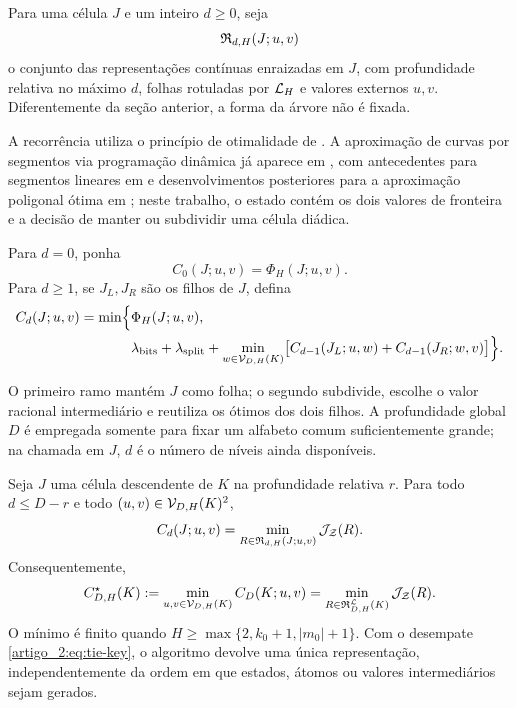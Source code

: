 Para uma célula $J$ e um inteiro $d\ge0$, seja
\[
 \mathfrak{R}_{d,H}(J;u,v)
\]
o conjunto das representações contínuas enraizadas em $J$, com profundidade
relativa no máximo $d$, folhas rotuladas por $\mathcal{L}_H$ e valores externos
$u,v$. Diferentemente da seção anterior, a forma da árvore não é fixada.

A recorrência utiliza o princípio de otimalidade de \citet{artigo_2-bellman1957}. A
aproximação de curvas por segmentos via programação dinâmica já aparece em
\citet{artigo_2-bellman1961}, com antecedentes para segmentos lineares em
\citet{artigo_2-stone1961} e desenvolvimentos posteriores para a aproximação poligonal
ótima em \citet{artigo_2-perezvidal1994}; neste trabalho, o estado contém os dois valores de
fronteira e a decisão de manter ou subdividir uma célula diádica.

\begin{definition}\label{map:artigo_2:7.1}
\label{artigo_2:def:variable-recurrence}
Para $d=0$, ponha
\begin{equation}
 C_0(J;u,v)=\Phi_H(J;u,v).
 \label{artigo_2:eq:variable-base}
\end{equation}
Para $d\ge1$, se $J_L,J_R$ são os filhos de $J$, defina
\begin{align}
 C_d(J;u,v)
 =\min\Bigl\{&
 \Phi_H(J;u,v),\notag\\
 &\lambda_{\rm bits}+\lambda_{\rm split}
 +\min_{w\in\mathcal{V}_{D,H}(K)}
 \bigl[C_{d-1}(J_L;u,w)+C_{d-1}(J_R;w,v)\bigr]
 \Bigr\}.
 \label{artigo_2:eq:variable-recurrence}
\end{align}
\end{definition}

O primeiro ramo mantém $J$ como folha; o segundo subdivide, escolhe o valor
racional intermediário e reutiliza os ótimos dos dois filhos. A profundidade
global $D$ é empregada somente para fixar um alfabeto comum suficientemente
grande; na chamada em $J$, $d$ é o número de níveis ainda disponíveis.

\begin{theorem}\label{map:artigo_2:7.2}
\label{artigo_2:thm:variable-correctness}
Seja $J$ uma célula descendente de $K$ na profundidade relativa $r$. Para todo
$d\le D-r$ e todo $(u,v)\in\mathcal{V}_{D,H}(K)^2$,
\begin{equation}
 C_d(J;u,v)
 =\min_{R\in\mathfrak{R}_{d,H}(J;u,v)}
 \mathcal{J}_{\mathcal Z}(R).
 \label{artigo_2:eq:variable-correctness}
\end{equation}
Consequentemente,
\begin{equation}
 C_{D,H}^{\star}(K)
 :=\min_{u,v\in\mathcal{V}_{D,H}(K)}C_D(K;u,v)
 =\min_{R\in\mathfrak{R}_{D,H}^{\mathcal{L}}(K)}
 \mathcal{J}_{\mathcal Z}(R).
 \label{artigo_2:eq:variable-global}
\end{equation}
O mínimo é finito quando
$H\ge\max\{2,k_0+1,|m_0|+1\}$. Com o desempate
\eqref{artigo_2:eq:tie-key}, o algoritmo devolve uma única representação, independentemente
da ordem em que estados, átomos ou valores intermediários sejam gerados.
\end{theorem}

